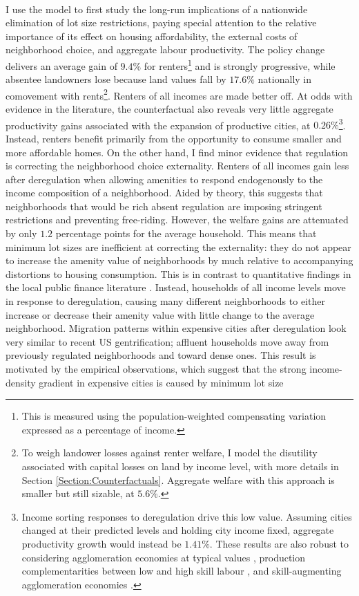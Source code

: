 \documentclass[12pt]{article}
\begin{document}
	\paragraph*{}
	I use the model to first study the long-run implications of a nationwide elimination of lot size restrictions, paying special attention to the relative importance of its effect on housing affordability, the external costs of neighborhood choice, and aggregate labour productivity. The policy change delivers an average gain of $9.4 \%$ for renters\footnote{This is measured using the population-weighted compensating variation expressed as a percentage of income.} and is strongly progressive, while absentee landowners lose because land values fall by $17.6 \%$ nationally in comovement with rents\footnote{To weigh landower losses against renter welfare, I model the disutility associated with capital losses on land by income level, with more details in Section \ref{Section:Counterfactuals}. Aggregate welfare with this approach is smaller but still sizable, at $5.6 \%$. }. Renters of all incomes are made better off. At odds with evidence in the literature, the counterfactual also reveals very little aggregate productivity gains associated with the expansion of productive cities, at $0.26 \%$\footnote{Income sorting responses to deregulation drive this low value. Assuming cities changed at their predicted levels and holding city income fixed, aggregate productivity growth would instead be $1.41\%$. These results are also robust to considering agglomeration economies at typical values \citep{Combes_review}, production complementarities between low and high skill labour \citep{card}, and skill-augmenting agglomeration economies \citep{diamond2016, ineqincreased}.}. Instead, renters benefit primarily from the opportunity to consume smaller and more affordable homes. On the other hand, I find minor evidence that regulation is correcting the neighborhood choice externality. Renters of all incomes gain less after deregulation when allowing amenities to respond endogenously to the income composition of a neighborhood. Aided by theory, this suggests that neighborhoods that would be rich absent regulation are imposing stringent restrictions and preventing free-riding. However, the welfare gains are attenuated by only $1.2$ percentage points for the average household. This means that minimum lot sizes are inefficient at correcting the externality: they do not appear to increase the amenity value of neighborhoods by much relative to accompanying distortions to housing consumption. This is in contrast to quantitative findings in the local public finance literature \citep{calabresetal, ineffTiebout}. Instead, households of all income levels move in response to deregulation, causing many different neighborhoods to either increase or decrease their amenity value with little change to the average neighborhood. Migration patterns within expensive cities after deregulation look very similar to recent US gentrification; affluent households move away from previously regulated neighborhoods and toward dense ones. This result is motivated by the empirical observations, which suggest that the strong income-density gradient in expensive cities is caused by minimum lot size 
\end{document}
